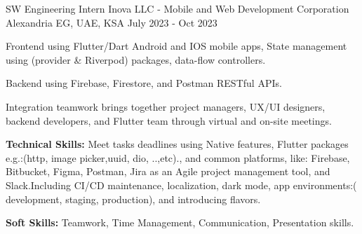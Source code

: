 

\begin{cventries}

  \cventry
    {SW Engineering Intern} %
    {Inova LLC - Mobile and Web Development Corporation} %
    {Alexandria EG, UAE, KSA} %
    {July 2023 - Oct 2023} %
    {
      \begin{cvitems} %
        \item {Frontend using Flutter/Dart Android and IOS mobile apps, State management using 
        (provider \& Riverpod) packages, data-flow controllers.}
        \item {Backend using Firebase, Firestore, and Postman RESTful APIs.}
        \item {Integration teamwork brings together project managers, UX/UI designers, backend developers, and Flutter team through virtual and on-site meetings.}
        \item {\textbf{Technical Skills:} Meet tasks deadlines using Native features, Flutter packages e.g.:(http, image picker,uuid, dio, ..,etc)., and common platforms, like: Firebase, Bitbucket, Figma, Postman, Jira as an Agile project management tool, and Slack.Including CI/CD maintenance, localization, dark mode, app environments:( development, staging, production), and introducing flavors.}
        \item {\textbf{Soft Skills:} Teamwork, Time Management, Communication, Presentation skills.}
      \end{cvitems}
    }

\end{cventries}


